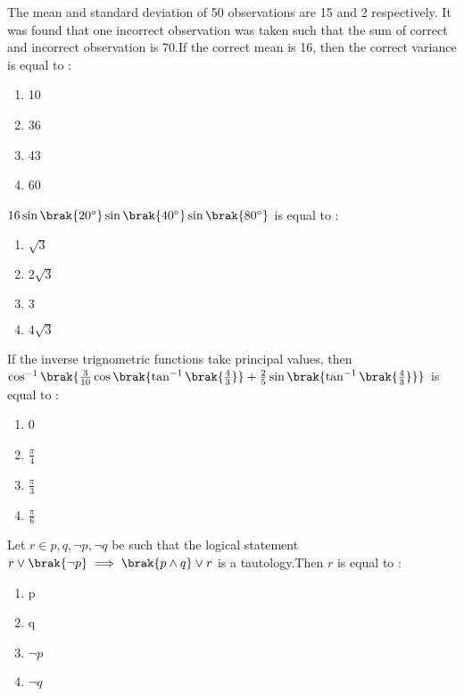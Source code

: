     \item The mean and standard deviation of 50 observations are 15 and 2 respectively. It was found that one incorrect observation was taken such that the sum of correct and incorrect observation is 70.If the correct mean is 16, then the correct variance is equal to :
    \hfill{}
   \begin{enumerate}
        \item 10
        \item 36
        \item 43
        \item 60
    \end{enumerate}
    \item $16\sin{\brak{20^\circ}}\sin{\brak{40^\circ}}\sin{\brak{80^\circ}}$ is equal to :
    \hfill{}
    \begin{enumerate}
        \item $\sqrt{3}$
        \item $2\sqrt{3}$
        \item $3$
        \item $4\sqrt{3}$
    \end{enumerate}
    \item If the inverse trignometric functions take principal values, then $\cos^{-1}\brak{\frac{3}{10}\cos\brak{\tan^{-1}\brak{\frac{4}{3}}}+\frac{2}{5}\sin\brak{\tan^{-1}\brak{\frac{4}{3}}}}$ is equal to :
 \hfill{}
    \begin{enumerate}
        \item 0
        \item $\frac{\pi}{4}$
        \item $\frac{\pi}{3}$
        \item $\frac{\pi}{6}$
    \end{enumerate}   
    \item Let $r \in {p,q,\neg p,\neg q}$ be such that the logical statement $r\lor \brak{\neg p}\implies\brak{p\land q}\lor r$ is a tautology.Then $r$ is equal to :
    \hfill{}
    \begin{enumerate}
        \item p
        \item q
        \item $\neg p$
        \item $\neg q$
    \end{enumerate}
